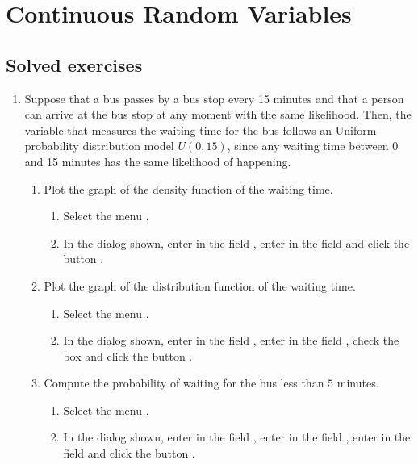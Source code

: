 
\chapter{Continuous Random Variables}

\section{Solved exercises}
\begin{enumerate}[leftmargin=*]
\item Suppose that a bus passes by a bus stop every 15 minutes and that a person can arrive at the bus stop at any moment with the same likelihood. 
Then, the variable that measures the waiting time for the bus follows an Uniform probability distribution model $U(0,15)$, since any waiting time between 0 and 15 minutes has the same likelihood of happening. 
\begin{enumerate}
\item Plot the graph of the density function of the waiting time. 
\begin{indication}
\begin{enumerate}
\item Select the menu .
\item In the dialog shown, enter  in the field , enter  in the field
 and click the button .
\end{enumerate}
\end{indication}

\item Plot the graph of the distribution function of the waiting time. 
\begin{indication}
\begin{enumerate}
\item Select the menu .
\item In the dialog shown, enter  in the field , enter  in the field
, check the box  and click the button .
\end{enumerate}
\end{indication}

\item Compute the probability of waiting for the bus less than $5$ minutes.
\begin{indication}
\begin{enumerate}
\item Select the menu .
\item In the dialog shown, enter  in the field , enter  in the field , enter  in the field  and click the button .
\end{enumerate}
\end{indication}


\end{enumerate}
\end{enumerate}
